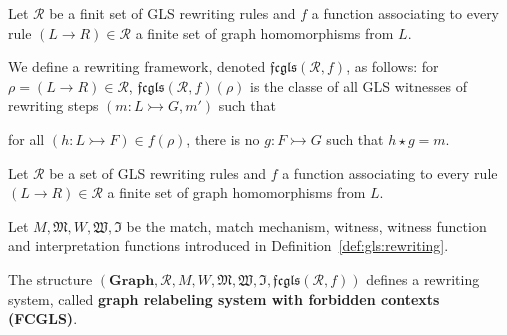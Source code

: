       \cite{litovsky1999graph}
      
      \begin{definition}
        Let $\mathcal{R}$ be a finit set of GLS rewriting rules and $f$ a function associating to every rule $(L \rightarrow R) \in \mathcal{R}$ a finite set of graph homomorphisms from $L$.
      
        We define a rewriting framework, denoted $\mathfrak{fcgls}(\mathcal{R},f)$, as follows: for $\rho = (L \rightarrow R) \in \mathcal{R}$, $\mathfrak{fcgls}(\mathcal{R},f)(\rho)$ is the classe of all GLS witnesses of rewriting steps
        $\left(  m: L \rightarrowtail G, m'  \right)$ such that 
      
        for all $(h : L \rightarrowtail F) \in f(\rho)$, there is no $g:F \rightarrowtail G$ such that $h \star g = m$.
      \end{definition}

      
      \begin{definition}
        Let $\mathcal{R}$ be a set of GLS rewriting rules and $f$ a function associating to every rule $(L \rightarrow R) \in \mathcal{R}$ a finite set of graph homomorphisms from $L$.

        Let $M, \mathfrak{M}, W , \mathfrak{W}, \mathfrak{I}$ be the match, match mechanism, witness, witness function and interpretation functions introduced in Definition~\ref{def:gls:rewriting}.
      
        The structure $(\mathbf{Graph},\mathcal{R},M,W,\mathfrak{M},\mathfrak{W},\mathfrak{I}, \mathfrak{fcgls}(\mathcal{R},f))$ defines a rewriting system, called \textbf{graph relabeling system with forbidden contexts (FCGLS)}. 
      \end{definition} 
      
